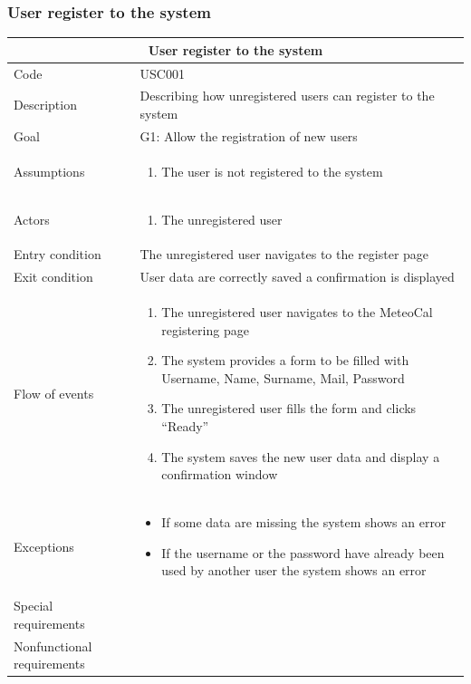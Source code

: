 \documentclass[10pt,a4paper,titlepage]{article}
\begin{document}
\clearpage
\subsubsection{User register to the system}

\begin{tabular}[h]{| p{3cm} | p{10cm} |}
\hline \multicolumn{2}{|c|}{\textbf{User register to the system}} \\ 
\hline Code & USC001 \\ 
\hline Description & Describing how unregistered users can register to the system\\
\hline Goal & G1: Allow the registration of new users \\
\hline Assumptions  & \begin{enumerate}
\item The user is not registered to the system
\end{enumerate} \\
\hline Actors &  \begin{enumerate}
\item The unregistered user
\end{enumerate} \\
\hline Entry condition & The unregistered user navigates to the register page \\
\hline Exit condition & User data are correctly saved a confirmation is displayed\\
\hline Flow of events & \begin{enumerate}
\item The unregistered user navigates to the MeteoCal registering page
\item The system provides a form to be filled with Username, Name, Surname, Mail, Password
\item The unregistered user fills the form and clicks “Ready”
\item The system saves the new user data and display a confirmation window
\end{enumerate}\\
\hline Exceptions & \begin{itemize}
\item If some data are missing the system shows an error
\item If the username or the password have already been used by another user the system shows an error 
\end{itemize} \\
\hline Special requirements & \\
\hline Nonfunctional requirements & \\
\hline
\end{tabular}
\end{document}
